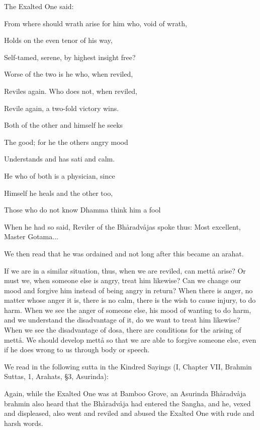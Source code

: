 \documentclass[12pt,twoside]{article}
\begin{document}
\bigskip

The Exalted One said:


\bigskip

From where should wrath arise for him who, void of wrath, 

Holds on the even tenor of his way,

Self{}-tamed, serene, by highest insight free?

Worse of the two is he who, when reviled, 

Reviles again. Who does not, when reviled, 

Revile again, a two{}-fold victory wins. 

Both of the other and himself he seeks

The good; for he the other{\textquotesingle}s angry mood

Understands and has sati and calm. 

He who of both is a physician, since

Himself he heals and the other too, 

Those who do not know Dhamma think him a fool


\bigskip

When he had so said, Reviler of the Bh{\aa}radv{\aa}jas spoke thus:
{\textasciigrave}{\textasciigrave}Most excellent, Master
Gotama...{\textquotesingle}{\textquotesingle}


\bigskip

We then read that he was ordained and not long after this became an
arahat. 

If we are in a similar situation, thus, when we are reviled, can
mett{\aa} arise? Or must we, when someone else is angry, treat him
likewise? Can we change our mood and forgive him instead of being angry
in return? When there is anger, no matter whose anger it is, there is
no calm, there is the wish to cause injury, to do harm. When we see the
anger of someone else, his mood of wanting to do harm, and we
understand the disadvantage of it, do we want to treat him likewise?
When we see the disadvantage of dosa, there are conditions for the
arising of mett{\aa}. We should develop mett{\aa} so that we are able
to forgive someone else, even if he does wrong to us through body or
speech. 

We read in the following sutta in the Kindred Sayings (I, Chapter VII,
Brahmin Suttas, 1, Arahats, {\S}3, Asurinda):


\bigskip

Again, while the Exalted One was at Bamboo Grove, an Asurinda
Bh{\aa}radv{\aa}ja brahmin also heard that the Bh{\aa}radv{\aa}ja had
entered the Sangha, and he, vexed and displeased, also went and reviled
and abused the Exalted One with rude and harsh words. 
\end{document}
